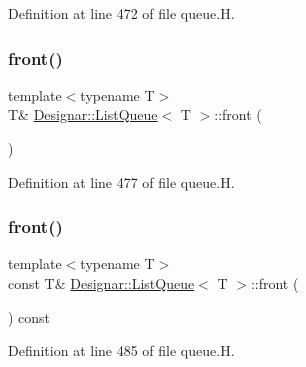 Definition at line 472 of file queue.\+H.

\mbox{\label{class_designar_1_1_list_queue_aa7fc9ba1a7fb8e65819be9da7f96e106}} 
\subsubsection{\texorpdfstring{front()}{front()}\hspace{0.1cm}{\footnotesize\ttfamily [1/2]}}
{\footnotesize\ttfamily template$<$typename T$>$ \\
T\& \hyperlink{class_designar_1_1_list_queue}{Designar\+::\+List\+Queue}$<$ T $>$\+::front (\begin{DoxyParamCaption}{ }\end{DoxyParamCaption})\hspace{0.3cm}{\ttfamily [inline]}}



Definition at line 477 of file queue.\+H.

\mbox{\label{class_designar_1_1_list_queue_abfc6bf50f4b4158e735ccd2c2d49ab1b}} 
\subsubsection{\texorpdfstring{front()}{front()}\hspace{0.1cm}{\footnotesize\ttfamily [2/2]}}
{\footnotesize\ttfamily template$<$typename T$>$ \\
const T\& \hyperlink{class_designar_1_1_list_queue}{Designar\+::\+List\+Queue}$<$ T $>$\+::front (\begin{DoxyParamCaption}{ }\end{DoxyParamCaption}) const\hspace{0.3cm}{\ttfamily [inline]}}



Definition at line 485 of file queue.\+H.

\mbox{\label{class_designar_1_1_list_queue_a4b934d649cd814fff5ec643843b8245d}} 
